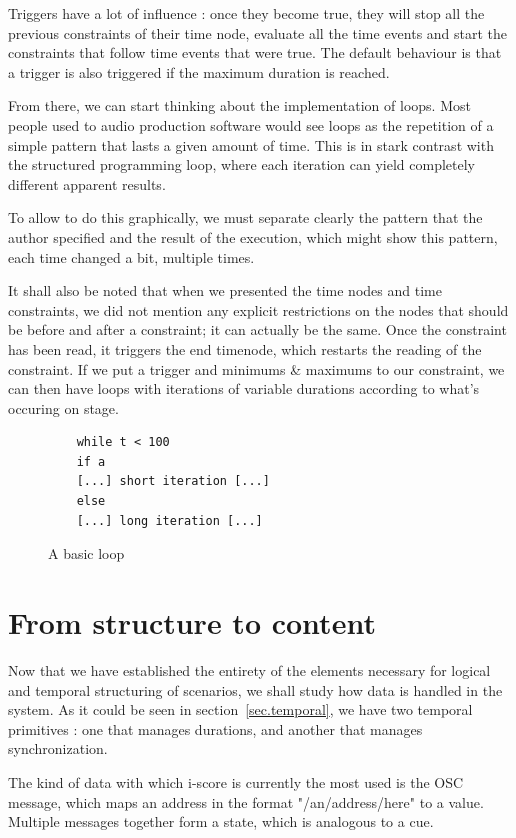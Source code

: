 \documentclass{sigchi}
\begin{document}
Triggers have a lot of influence : once they become true, they will stop all the previous constraints of their time node, evaluate all the time events and start the constraints that follow time events that were true. The default behaviour is that a trigger is also triggered if the maximum duration is reached.

From there, we can start thinking about the implementation of loops. Most people used to audio production software would see loops as the repetition of a simple pattern that lasts a given amount of time. This is in stark contrast with the structured programming loop, where each iteration can yield completely different apparent results.

To allow to do this graphically, we must separate clearly the pattern that the author specified and the result of the execution, which might show this pattern, each time changed a bit, multiple times.

It shall also be noted that when we presented the time nodes and time constraints, we did not mention any explicit restrictions on the nodes that should be before and after a constraint; it can actually be the same. Once the constraint has been read, it triggers the end timenode, which restarts the reading of the constraint. If we put a trigger and minimums \& maximums to our constraint, we can then have loops with iterations of variable durations according to what's occuring on stage.

\begin{figure}
	\centering
	\begin{lstlisting}
	while t < 100
	if a
	[...] short iteration [...]
	else
	[...] long iteration [...]           
	\end{lstlisting}
	\caption{A basic loop}	
	\label{fig.loopcode}
\end{figure}

\section{From structure to content}
Now that we have established the entirety of the elements necessary for logical and temporal structuring of scenarios, we shall study how data is handled in the system.
As it could be seen in section~\ref{sec.temporal}, we have two temporal primitives : one that manages durations, and another that manages synchronization.

The kind of data with which i-score is currently the most used is the OSC message, which maps an address in the format "/an/address/here" to a value. Multiple messages together form a state, which is analogous to a cue.
\end{document}
